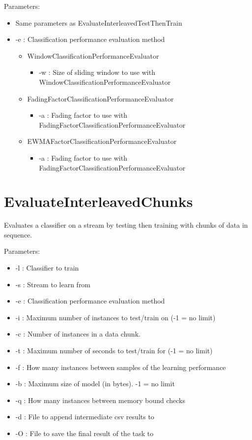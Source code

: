 \documentclass[a4paper,12pt,twoside]{book}
\begin{document}
Parameters:
\begin{itemize}
 \item Same parameters as EvaluateInterleavedTestThenTrain
\item -e : Classification performance evaluation method
\begin{itemize}
 \item WindowClassificationPerformanceEvaluator
\begin{itemize}
\item -w : Size of sliding window to use with WindowClassificationPerformanceEvaluator
\end{itemize}
 \item FadingFactorClassificationPerformanceEvaluator
\begin{itemize}
\item -a : Fading factor to use with FadingFactorClassificationPerformanceEvaluator
\end{itemize}
 \item EWMAFactorClassificationPerformanceEvaluator
\begin{itemize}
\item -a : Fading factor to use with FadingFactorClassificationPerformanceEvaluator
\end{itemize}
\end{itemize}
\end{itemize}

\section{EvaluateInterleavedChunks}

Evaluates a classifier on a stream by testing then training with chunks of data in sequence.

Parameters:
\begin{itemize}
\item -l : Classifier to train
\item -s : Stream to learn from
\item -e : Classification performance evaluation method
\item -i : Maximum number of instances to test/train on  (-1 = no limit)
\item -c : Number of instances in a data chunk.
\item -t : Maximum number of seconds to test/train for (-1 = no limit)
\item -f : How many instances between samples of the learning performance
\item -b : Maximum size of model (in bytes). -1 = no limit
\item -q : How many instances between memory bound checks
\item -d : File to append intermediate csv results to
\item -O : File to save the final result of the task to
\end{itemize}
\end{document}

